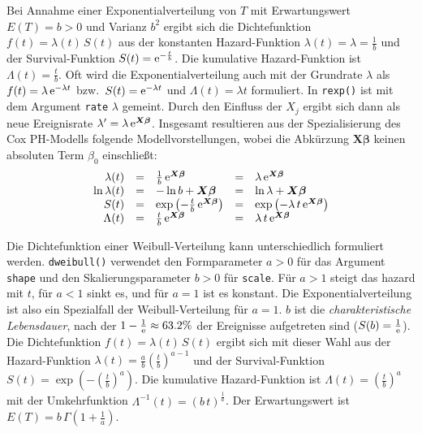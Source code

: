 Bei Annahme einer Exponentialverteilung von $T$ mit Erwartungswert $E(T) = b > 0$ und Varianz $b^{2}$ ergibt sich die Dichtefunktion $f(t) = \lambda(t) \, S(t)$ aus der konstanten Hazard-Funktion $\lambda(t) = \lambda = \frac{1}{b}$ und der Survival-Funktion $S(t) = {\mathrm{e}}^{-\frac{t}{b}}$. Die kumulative Hazard-Funktion ist $\Lambda(t) = \frac{t}{b}$. Oft wird die Exponentialverteilung auch mit der Grundrate $\lambda$ als $f(t) = \lambda \, {\mathrm{e}}^{-\lambda t}$ bzw.\ $S(t) = {\mathrm{e}}^{-\lambda t}$ und $\Lambda(t) = \lambda t$ formuliert. In \lstinline!rexp()! ist mit dem Argument \lstinline!rate! $\lambda$ gemeint. Durch den Einfluss der $X_{j}$ ergibt sich dann als neue Ereignisrate $\lambda' = \lambda \, {\mathrm{e}}^{\bm{X} \bm{\beta}}$. Insgesamt resultieren aus der Spezialisierung des Cox PH-Modells folgende Modellvorstellungen, wobei die Abkürzung $\bm{X} \bm{\beta}$ keinen absoluten Term $\beta_{0}$ einschließt:
\begin{equation*}
\begin{array}{rclcl}
\lambda(t)     &=& \frac{1}{b} \, {\mathrm{e}}^{\bm{X} \bm{\beta}} &=& \lambda \, {\mathrm{e}}^{\bm{X} \bm{\beta}}\\
\ln \lambda(t) &=& -\ln b + \bm{X} \bm{\beta} &=& \ln \lambda + \bm{X} \bm{\beta}\\
S(t)           &=& \exp\left(-\frac{t}{b} \, {\mathrm{e}}^{\bm{X} \bm{\beta}}\right) &=& \exp\left(-\lambda \, t \, {\mathrm{e}}^{\bm{X} \bm{\beta}}\right)\\
\Lambda(t)     &=& \frac{t}{b} \, {\mathrm{e}}^{\bm{X} \bm{\beta}} &=& \lambda \, t \, {\mathrm{e}}^{\bm{X} \bm{\beta}}
\end{array}
\end{equation*}

Die Dichtefunktion einer Weibull-Verteilung kann unterschiedlich formuliert werden. \lstinline!dweibull()! verwendet den Formparameter $a > 0$ für das Argument \lstinline!shape! und den Skalierungsparameter $b > 0$ für \lstinline!scale!. Für $a > 1$ steigt das hazard mit $t$, für $a < 1$ sinkt es, und für $a = 1$ ist es konstant. Die Exponentialverteilung ist also ein Spezialfall der Weibull-Verteilung für $a = 1$. $b$ ist die \emph{charakteristische Lebensdauer}, nach der $1-\frac{1}{{\mathrm{e}}} \approx 63.2\%$ der Ereignisse aufgetreten sind ($S(b) = \frac{1}{{\mathrm{e}}}$). Die Dichtefunktion $f(t) = \lambda(t) \, S(t)$ ergibt sich mit dieser Wahl aus der Hazard-Funktion $\lambda(t) = \frac{a}{b} \left(\frac{t}{b}\right)^{a-1}$ und der Survival-Funktion $S(t) = \exp(-(\frac{t}{b})^{a})$. Die kumulative Hazard-Funktion ist $\Lambda(t) = (\frac{t}{b})^{a}$ mit der Umkehrfunktion $\Lambda^{-1}(t) = (b \, t)^{\frac{1}{a}}$. Der Erwartungswert ist $E(T) = b \, \Gamma(1 + \frac{1}{a})$.

